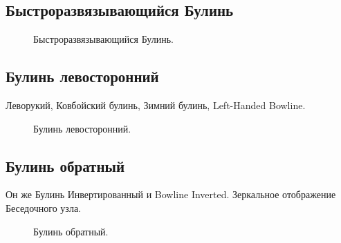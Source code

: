 \subsection{Быстроразвязывающийся Булинь}

\begin{figure}[H]\centering
	\begin{minipage}{1\linewidth}
		\begin{center}
			\tcbox[enhanced jigsaw,colframe=black,opacityframe=0.5,opacityback=0.5]
			{\centering{}}
		\end{center}
	\end{minipage}
\caption{Быстроразвязывающийся Булинь.}
\label{ris:Besedochny_slide}
\end{figure}

\subsection{Булинь левосторонний}

Леворукий, Ковбойский булинь, Зимний булинь, Left-Handed Bowline.

\begin{figure}[H]\centering
	\begin{minipage}{1\linewidth}
		\begin{center}
			\tcbox[enhanced jigsaw,colframe=black,opacityframe=0.5,opacityback=0.5]
			{\centering{}}
		\end{center}
	\end{minipage}
\caption{Булинь левосторонний.}
\label{ris:Besedochny_Left-Hand}
\end{figure}

\subsection{Булинь обратный}

Он же Булинь Инвертированный и Bowline Inverted. Зеркальное отображение Беседочного узла.

\begin{figure}[H]\centering
	\begin{minipage}{1\linewidth}
		\begin{center}
			\tcbox[enhanced jigsaw,colframe=black,opacityframe=0.5,opacityback=0.5]
			{\centering{}}
		\end{center}
	\end{minipage}
\caption{Булинь обратный.}
\label{ris:Besedochny_Inverted}
\end{figure}

